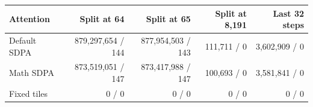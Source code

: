 \begin{tabular}{lrrrr}
\toprule
Attention & Split at 64 & Split at 65 & Split at 8,191 & Last 32 steps \\
\midrule
Default SDPA & 879,297,654 / 144 & 877,954,503 / 143 & 111,711 / 0 & 3,602,909 / 0 \\
Math SDPA & 873,519,051 / 147 & 873,417,988 / 147 & 100,693 / 0 & 3,581,841 / 0 \\
Fixed tiles & 0 / 0 & 0 / 0 & 0 / 0 & 0 / 0 \\
\bottomrule
\end{tabular}
